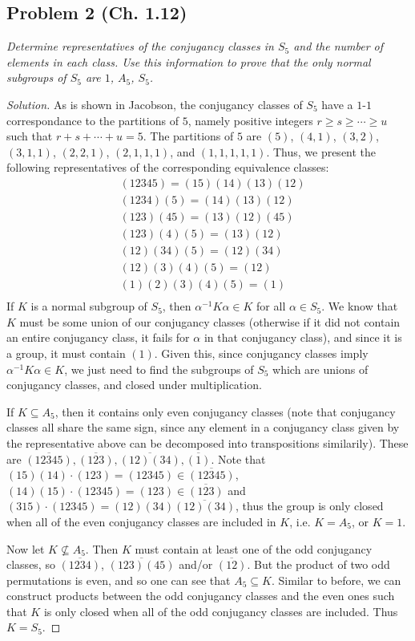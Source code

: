 \documentclass{article}
\begin{document}
\subsection*{Problem 2 (Ch. 1.12)}
{\it Determine representatives of the conjugancy classes in $S_5$
and the number of elements in each class.
Use this information to prove that the only normal subgroups
of $S_5$ are $1$, $A_5$, $S_5$.}
\begin{proof}[Solution]\let\qed\relax
	As is shown in Jacobson, the conjugancy classes of $S_5$
	have a $1$-$1$ correspondance to the partitions of $5$,
	namely positive integers $r \geq s \geq \cdots \geq u$
	such that $r + s + \cdots + u = 5$.
	The partitions of $5$ are $(5)$, $(4,1)$, $(3,2)$, $(3,1,1)$,
	$(2,2,1)$, $(2,1,1,1)$, and $(1,1,1,1,1)$.
	Thus, we present the following representatives
	of the corresponding equivalence classes:
	\begin{align*}
		&(12345) = (15)(14)(13)(12)\\
		&(1234)(5) = (14)(13)(12)\\
		&(123)(45) = (13)(12)(45)\\
		&(123)(4)(5) = (13)(12)\\
		&(12)(34)(5) = (12)(34)\\
		&(12)(3)(4)(5) = (12)\\
		&(1)(2)(3)(4)(5) = (1)\\
	\end{align*}
	If $K$ is a normal subgroup of $S_5$,
	then $\alpha^{-1} K \alpha \in K$ for all $\alpha \in S_5$.
	We know that $K$ must be some union of our conjugancy
	classes (otherwise if it did not contain an entire conjugancy class,
	it fails for $\alpha$ in that conjugancy class),
	and since it is a group, it must contain $(1)$.
	Given this, since conjugancy classes imply $\alpha^{-1}K\alpha \in K$,
	we just need to find the subgroups of $S_5$
	which are unions of conjugancy classes,
	and closed under multiplication.

	If $K \subseteq A_5$,
	then it contains only even conjugancy classes
	(note that conjugancy classes all share the same sign,
	since any element in a conjugancy class given by the representative
	above can be decomposed into transpositions similarily).
	These are $\overline{(12345)}, \overline{(123)}, \overline{(12)(34)}, \overline{(1)}$.
	Note that $(15)(14)\cdot(123) = (12345) \in \overline{(12345)}$,
	$(14)(15)\cdot(12345) = (123) \in \overline{(123)}$
	and $(315)\cdot(12345) = (12)(34)\overline{(12)(34)}$,
	thus the group is only closed when
	all of the even conjugancy classes are included in $K$,
	i.e. $K = A_5$,
	or $K = 1$.

	Now let $K \not\subseteq A_5$.
	Then $K$ must contain at least one of the odd conjugancy classes,
	so $\overline{(1234)}$, $\overline{(123)(45)}$
	and/or $\overline{(12)}$.
	But the product of two odd permutations is even,
	and so one can see that $A_5 \subseteq K$.
	Similar to before, we can construct products
	between the odd conjugancy classes and the even ones
	such that $K$ is only closed when all of the odd conjugancy
	classes are included.
	Thus $K = S_5$.
\end{proof}
\end{document}
